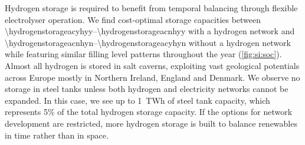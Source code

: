 Hydrogen storage is required to benefit from temporal balancing through flexible
electrolyser operation. We find cost-optimal storage capacities between
\SIrange{\hydrogenstorageacyhyy}{\hydrogenstorageacnhyy}{\twh} with a hydrogen
network and \SIrange{\hydrogenstorageacnhyn}{\hydrogenstorageacyhyn}{\twh}
without a hydrogen network while featuring similar filling level patterns
throughout the year (\cref{fig:si:soc}). Almost all hydrogen is stored in salt
caverns, exploiting vast geological potentials across Europe mostly in Northern
Ireland, England and Denmark. We observe no storage in steel tanks unless both
hydrogen and electricity networks cannot be expanded. In this case, we see up to
1~TWh of steel tank capacity, which represents 5\% of the total hydrogen storage
capacity. If the options for network development are restricted, more hydrogen
storage is built to balance renewables in time rather than in space.

